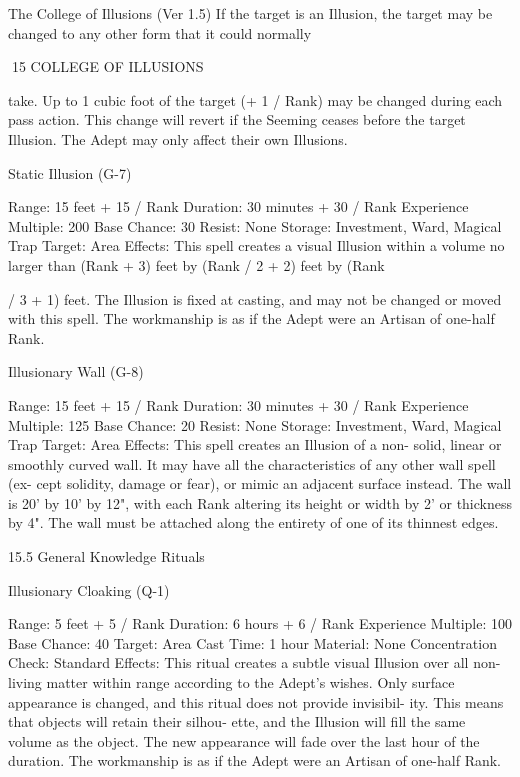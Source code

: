 \begin{Chapter}{The College of Illusions (Ver 1.5)}
If  the  target  is  an  Illusion,  the  target  may  be 
changed  to  any  other  form  that  it  could  normally 

15 COLLEGE OF ILLUSIONS 

take. Up to 1 cubic foot of the target (+ 1 / Rank) 
may  be  changed  during  each  pass  action.  This 
change will revert if the Seeming ceases before the 
target  Illusion.  The  Adept  may  only  affect  their 
own Illusions. 

Static Illusion (G-7) 

Range: 15 feet + 15 / Rank 
Duration: 30 minutes + 30 / Rank 
Experience Multiple: 200 
Base Chance: 30%
Resist: None 
Storage: Investment, Ward, Magical Trap 
Target: Area 
Effects: This spell creates a visual Illusion within a 
volume no larger than (Rank + 3) feet by (Rank / 2 
+ 2) feet by (Rank 

/  3  +  1)  feet.  The  Illusion  is  fixed  at  casting,  and 
may not be changed or moved with this spell. The 
workmanship is as if the Adept were an Artisan of 
one-half Rank. 

Illusionary Wall (G-8) 

Range: 15 feet + 15 / Rank 
Duration: 30 minutes + 30 / Rank 
Experience Multiple: 125 
Base Chance: 20%
Resist: None 
Storage: Investment, Ward, Magical Trap 
Target: Area 
Effects:  This  spell  creates  an  Illusion  of  a  non-
solid,  linear  or  smoothly  curved  wall.  It  may  have 
all  the  characteristics  of  any  other  wall  spell  (ex-
cept solidity, damage or fear), or mimic an adjacent 
surface instead. The wall is 20’ by 10’ by 12", with 
each  Rank  altering  its  height  or  width  by  2’  or 
thickness  by  4".  The  wall  must  be  attached  along 
the entirety of one of its thinnest edges. 

15.5 General Knowledge Rituals 

Illusionary Cloaking (Q-1) 

Range: 5 feet + 5 / Rank 
Duration: 6 hours + 6 / Rank 
Experience Multiple: 100 
Base Chance: 40%
Target: Area 
Cast Time: 1 hour 
Material: None 
Concentration Check: Standard 
Effects:  This  ritual  creates  a  subtle  visual  Illusion 
over  all  non-living  matter  within  range  according 
to  the  Adept’s  wishes.  Only  surface  appearance  is 
changed, and this ritual does not provide invisibil-
ity. This means that objects will retain their silhou-
ette,  and  the  Illusion  will  fill  the  same  volume  as 
the  object.  The  new  appearance  will  fade  over  the 
last hour of the duration. The workmanship is as if 
the Adept were an Artisan of one-half Rank. 


\end{Chapter}

